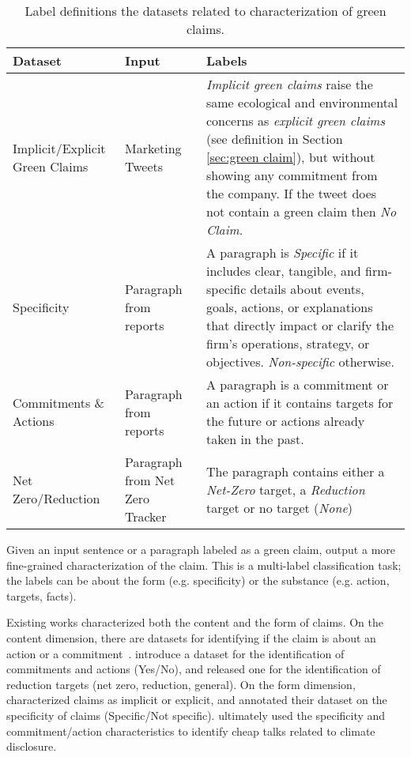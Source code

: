 \begin{table}[ht]
\centering
\begin{tabular}{p{2.5cm}p{3.5cm}p{8cm}}
\toprule
\textbf{Dataset}  & \textbf{Input}  & \textbf{Labels}\\ \midrule
Implicit/Explicit Green Claims \cite{vinicius_woloszyn_towards_2021}  & Marketing Tweets  & \textit{Implicit green claims} raise the same ecological and environmental concerns as \textit{explicit green claims} (see definition in Section \ref{sec:green claim}), but without showing any commitment from the company. If the tweet does not contain a green claim then \textit{No Claim}. \\ \midrule
Specificity \cite{bingler2023cheaptalkspecificitysentiment}  & Paragraph from reports  & A paragraph is \textit{Specific} if it includes clear, tangible, and firm-specific details about events, goals, actions, or explanations that directly impact or clarify the firm's operations, strategy, or objectives. \textit{Non-specific} otherwise. \\ \midrule
Commitments \& Actions\cite{bingler2023cheaptalkspecificitysentiment} &  Paragraph from reports  & A paragraph is a commitment or an action if it contains targets for the future or actions already taken in the past. \\ \midrule
Net Zero/Reduction \cite{tobias_schimanski_climatebert-netzero_2023} & Paragraph from Net Zero Tracker~\cite{netzerotracker2023} & The paragraph 
 contains either a \textit{Net-Zero} target, a \textit{Reduction} target or no target (\textit{None})  \\ \bottomrule
\end{tabular}
\caption{Label definitions the datasets related to characterization of green claims.}
\label{tab:guidelines characteristics}
\end{table}

\task Given an input sentence or a paragraph labeled as a green claim, output a more fine-grained characterization of the claim. This is a multi-label classification task; the labels can be about the form (e.g. specificity) or the substance (e.g. action, targets, facts). 

\datasets Existing works characterized both the content and the form of claims. On the content dimension, there are datasets for identifying if the claim is about an action or a commitment~\cite{bingler2023cheaptalkspecificitysentiment, tobias_schimanski_climatebert-netzero_2023}. \citet{bingler2023cheaptalkspecificitysentiment} introduce a dataset for the identification of commitments and actions (Yes/No), and \citet{tobias_schimanski_climatebert-netzero_2023} released one for the identification of reduction targets (net zero, reduction, general). On the form dimension, \citet{vinicius_woloszyn_towards_2021} characterized claims as implicit or explicit, and \citet{bingler2023cheaptalkspecificitysentiment} annotated their dataset on the specificity of claims (Specific/Not specific). \citet{bingler2023cheaptalkspecificitysentiment} ultimately used the specificity and commitment/action characteristics to identify cheap talks related to climate disclosure.  

